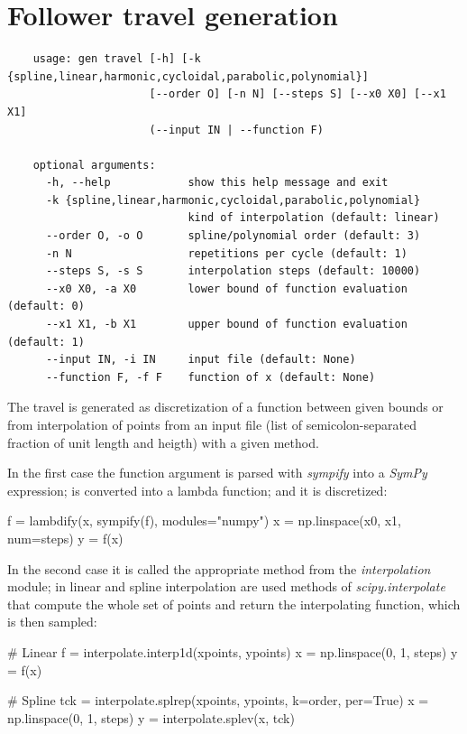 \documentclass[a4paper,10pt,twoside]{article}
\begin{document}
\section{Follower travel generation}
    \begin{verbatim}
    usage: gen travel [-h] [-k {spline,linear,harmonic,cycloidal,parabolic,polynomial}]
                      [--order O] [-n N] [--steps S] [--x0 X0] [--x1 X1]
                      (--input IN | --function F)

    optional arguments:
      -h, --help            show this help message and exit
      -k {spline,linear,harmonic,cycloidal,parabolic,polynomial}
                            kind of interpolation (default: linear)
      --order O, -o O       spline/polynomial order (default: 3)
      -n N                  repetitions per cycle (default: 1)
      --steps S, -s S       interpolation steps (default: 10000)
      --x0 X0, -a X0        lower bound of function evaluation (default: 0)
      --x1 X1, -b X1        upper bound of function evaluation (default: 1)
      --input IN, -i IN     input file (default: None)
      --function F, -f F    function of x (default: None)
    \end{verbatim}

    The travel is generated as discretization of a function between given bounds or
    from interpolation of points from an input file (list of semicolon-separated fraction of unit length and heigth)
    with a given method.

    In the first case the function argument is parsed with \emph{sympify} into
    a \emph{SymPy} expression; is converted into a lambda function; and it is discretized:

    \begin{pycode}
    f = lambdify(x, sympify(f), modules="numpy")
    x = np.linspace(x0, x1, num=steps)
    y = f(x)
    \end{pycode}

    In the second case it is called the appropriate method from the \emph{interpolation} module;
    in linear and spline interpolation are used methods of \emph{scipy.interpolate} that
    compute the whole set of points and return the interpolating function, which is then sampled:

    \begin{pycode}
    # Linear
    f = interpolate.interp1d(xpoints, ypoints)
    x = np.linspace(0, 1, steps)
    y = f(x)

    # Spline
    tck = interpolate.splrep(xpoints, ypoints, k=order, per=True)
    x = np.linspace(0, 1, steps)
    y = interpolate.splev(x, tck)
    \end{pycode}
\end{document}
